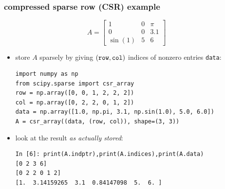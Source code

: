 \documentclass[10pt,
               svgnames,
               hyperref={colorlinks,citecolor=DeepPink4,linkcolor=FireBrick,urlcolor=Maroon},
               usepdftitle=false]{beamer}
\begin{document}
\begin{frame}[fragile]
\frametitle{compressed sparse row (CSR) example}

$$A = \begin{bmatrix} 1 & 0 & \pi \\ 0 & 0 & 3.1 \\ \sin(1) & 5 & 6 \end{bmatrix}$$

\begin{itemize}
\item store $A$ sparsely by giving $(\text{\texttt{row}},\text{\texttt{col}})$ indices of nonzero entries \texttt{data}:

\begin{center}
\begin{minipage}{0.85\textwidth}
\begin{verbatim}
import numpy as np
from scipy.sparse import csr_array
row = np.array([0, 0, 1, 2, 2, 2])
col = np.array([0, 2, 2, 0, 1, 2])
data = np.array([1.0, np.pi, 3.1, np.sin(1.0), 5.0, 6.0])
A = csr_array((data, (row, col)), shape=(3, 3))
\end{verbatim}
\end{minipage}
\end{center}

\bigskip
\item look at the result \emph{as actually stored}:
\begin{center}
\begin{minipage}{0.8\textwidth}
\begin{verbatim}
In [6]: print(A.indptr),print(A.indices),print(A.data)
[0 2 3 6]
[0 2 2 0 1 2]
[1.  3.14159265  3.1  0.84147098  5.  6. ]
 
 
 
\end{verbatim}
\end{minipage}
\end{center}
\end{itemize}
\end{frame}
\end{document}
